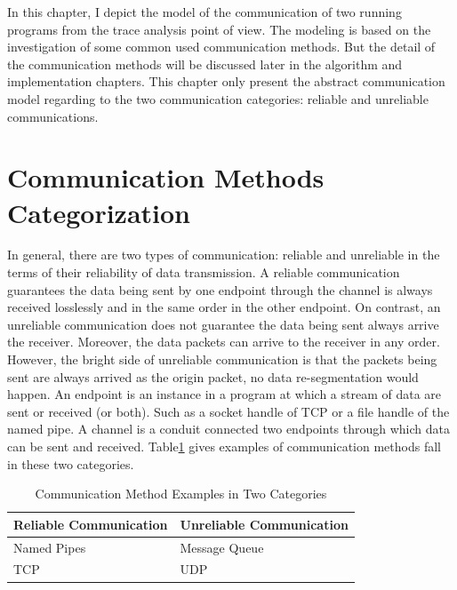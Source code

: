 
\label{chapter:mod}
In this chapter, I depict the model of the communication of two running programs from the trace analysis point of view. The modeling is based on the investigation of some common used communication methods. But the detail of the communication methods will be discussed later in the algorithm and implementation chapters. This chapter only present the abstract communication model regarding to the two communication categories: reliable and unreliable communications. 

\section{Communication Methods Categorization}
In general, there are two types of communication: reliable and unreliable in the terms of their reliability of data transmission. A reliable communication guarantees the data being sent by one endpoint through the channel is always received losslessly and in the same order in the other endpoint. On contrast, an unreliable communication does not guarantee the data being sent always arrive the receiver. Moreover, the data packets can arrive to the receiver in any order. However, the bright side of unreliable communication is that the packets being sent are always arrived as the origin packet, no data re-segmentation would happen. An endpoint is an instance in a program at which a stream of data are sent or received (or both). Such as a socket handle of TCP or a file handle of the named pipe. A channel is a conduit connected two endpoints through  which data can be sent and received. Table\ref{methodsInCategories} gives examples of communication methods fall in these two categories.
\begin{table}[H]
\centering
\caption{Communication Method Examples in Two Categories}
\label{methodsInCategories}
\begin{tabular}{|l|l|}
 \hline
\textbf{Reliable Communication}& \textbf{Unreliable Communication}\\
 \hline
Named Pipes & Message Queue   \\
TCP &  UDP \\
 \hline
\end{tabular}
\end{table}


